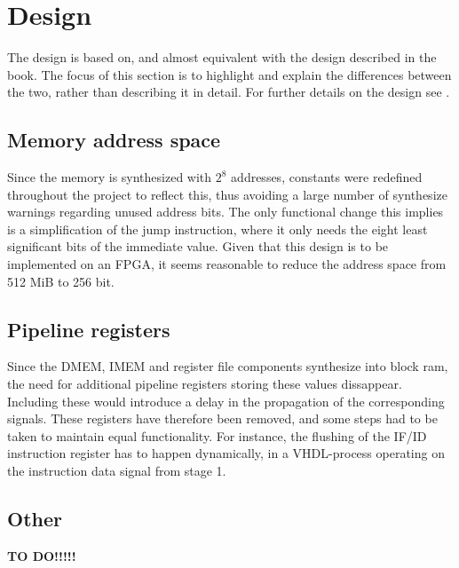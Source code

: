 \section{Design}
The design is based on, and almost equivalent with the design described in the
book. The focus of this section is to highlight and explain the differences
between the two, rather than describing it in detail. For further details on the
design see \cite{patterson12}.
\subsection{Memory address space}
Since the memory is synthesized with $2^8$ addresses, constants were redefined
throughout the project to reflect this, thus avoiding a large number of
synthesize warnings regarding unused address bits. The only functional change
this implies is a simplification of the jump instruction, where it only needs
the eight least significant bits of the immediate value. Given that this design
is to be implemented on an FPGA, it seems reasonable to reduce the address
space from 512 MiB to 256 bit.

\subsection{Pipeline registers}
Since the DMEM, IMEM and register file components synthesize into block ram, the
need for additional pipeline registers storing these values dissappear.
Including these would introduce a delay in the propagation of the corresponding
signals. These registers have therefore been removed, and some steps had to be
taken to maintain equal functionality. For instance, the flushing of the IF/ID
instruction register has to happen dynamically, in a VHDL-process operating on
the instruction data signal from stage 1.

\subsection{Other}
\textbf{TO DO!!!!!}

